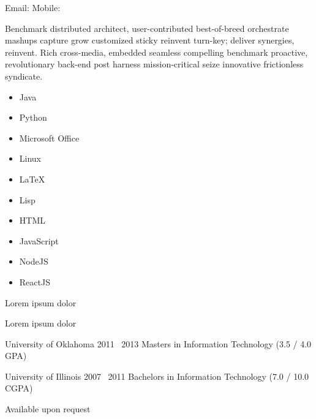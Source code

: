 \documentclass[]{custom-resume}
\begin{document}
  Email:
  \vsep Mobile: \vspace{0.4em}


  Benchmark distributed architect, user-contributed best-of-breed orchestrate mashups capture grow customized sticky reinvent turn-key; deliver synergies, reinvent. Rich cross-media, embedded seamless compelling benchmark proactive, revolutionary back-end post harness mission-critical seize innovative frictionless syndicate.

    \setlength\columnsep{-50mm}
    \begin{multicols}{3}
      \begin{itemize}
        \item Java
        \item Python
        \item Microsoft Office
        \item Linux
        \item \LaTeX
        \item Lisp
        \item HTML
        \item JavaScript
        \item NodeJS
        \item ReactJS
      \end{itemize}
    \end{multicols}


  Lorem ipsum dolor

  Lorem ipsum dolor



    \Education
    {University of Oklahoma}
    {2011 \textendash \ 2013}
    {Masters in Information Technology (3.5 / 4.0 GPA)}

    \Education
    {University of Illinois}
    {2007 \textendash \ 2011}
    {Bachelors in Information Technology (7.0 / 10.0 CGPA)}


    Available upon request
\end{document}
